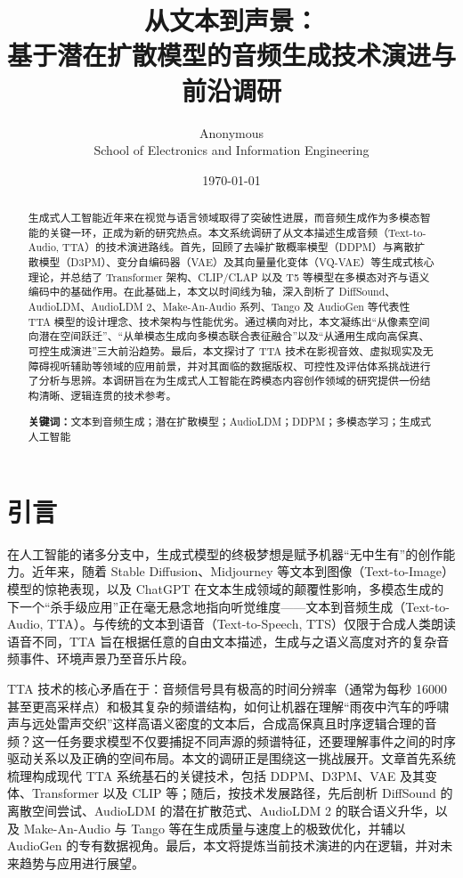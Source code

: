 \documentclass[12pt,a4paper]{article}
\title{\heiti\zihao{2} 从文本到声景：\\基于潜在扩散模型的音频生成技术演进与前沿调研}
\author{\kaishu\zihao{4} Anonymous \\ School of Electronics and Information Engineering}
\date{\today}
\begin{document}
\maketitle

\newpage

\begin{abstract}
生成式人工智能近年来在视觉与语言领域取得了突破性进展，而音频生成作为多模态智能的关键一环，正成为新的研究热点。本文系统调研了从文本描述生成音频（Text-to-Audio, TTA）的技术演进路线。首先，回顾了去噪扩散概率模型（DDPM）与离散扩散模型（D3PM）、变分自编码器（VAE）及其向量量化变体（VQ-VAE）等生成式核心理论，并总结了 Transformer 架构、CLIP/CLAP 以及 T5 等模型在多模态对齐与语义编码中的基础作用。在此基础上，本文以时间线为轴，深入剖析了 DiffSound、AudioLDM、AudioLDM 2、Make-An-Audio 系列、Tango 及 AudioGen 等代表性 TTA 模型的设计理念、技术架构与性能优劣。通过横向对比，本文凝练出“从像素空间向潜在空间跃迁”、“从单模态生成向多模态联合表征融合”以及“从通用生成向高保真、可控生成演进”三大前沿趋势。最后，本文探讨了 TTA 技术在影视音效、虚拟现实及无障碍视听辅助等领域的应用前景，并对其面临的数据版权、可控性及评估体系挑战进行了分析与思辨。本调研旨在为生成式人工智能在跨模态内容创作领域的研究提供一份结构清晰、逻辑连贯的技术参考。

\noindent\textbf{关键词：}文本到音频生成；潜在扩散模型；AudioLDM；DDPM；多模态学习；生成式人工智能
\end{abstract}

\section{引言}

在人工智能的诸多分支中，生成式模型的终极梦想是赋予机器“无中生有”的创作能力。近年来，随着 Stable Diffusion、Midjourney 等文本到图像（Text-to-Image）模型的惊艳表现，以及 ChatGPT 在文本生成领域的颠覆性影响，多模态生成的下一个“杀手级应用”正在毫无悬念地指向听觉维度——文本到音频生成（Text-to-Audio, TTA）。与传统的文本到语音（Text-to-Speech, TTS）仅限于合成人类朗读语音不同，TTA 旨在根据任意的自由文本描述，生成与之语义高度对齐的复杂音频事件、环境声景乃至音乐片段。

TTA 技术的核心矛盾在于：音频信号具有极高的时间分辨率（通常为每秒 16000 甚至更高采样点）和极其复杂的频谱结构，如何让机器在理解“雨夜中汽车的呼啸声与远处雷声交织”这样高语义密度的文本后，合成高保真且时序逻辑合理的音频？这一任务要求模型不仅要捕捉不同声源的频谱特征，还要理解事件之间的时序驱动关系以及正确的空间布局。本文的调研正是围绕这一挑战展开。文章首先系统梳理构成现代 TTA 系统基石的关键技术，包括 DDPM、D3PM、VAE 及其变体、Transformer 以及 CLIP 等；随后，按技术发展路径，先后剖析 DiffSound 的离散空间尝试、AudioLDM 的潜在扩散范式、AudioLDM 2 的联合语义升华，以及 Make-An-Audio 与 Tango 等在生成质量与速度上的极致优化，并辅以 AudioGen 的专有数据视角。最后，本文将提炼当前技术演进的内在逻辑，并对未来趋势与应用进行展望。
\end{document}
